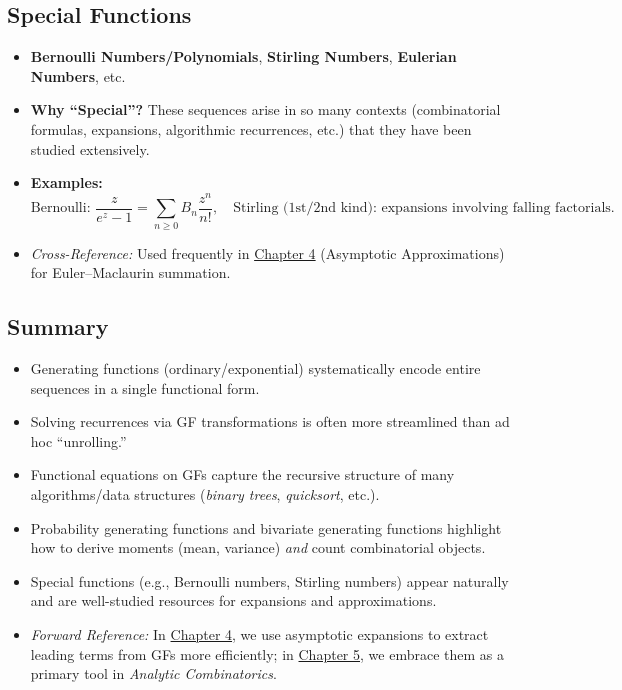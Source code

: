 \documentclass[11pt,letterpaper]{article}
\begin{document}
\subsection{Special Functions}
\begin{itemize}
  \item \textbf{Bernoulli Numbers/Polynomials}, \textbf{Stirling Numbers}, \textbf{Eulerian Numbers}, etc.
  \item \textbf{Why “Special”?} These sequences arise in so many contexts (combinatorial formulas, expansions, algorithmic recurrences, etc.) that they have been studied extensively.
  \item \textbf{Examples:}
    \[
      \text{Bernoulli: } \frac{z}{e^z-1}=\sum_{n\ge0}B_n\frac{z^n}{n!},\quad
      \text{Stirling (1st/2nd kind): expansions involving falling factorials.}
    \]
  \item \emph{Cross-Reference:} Used frequently in \hyperref[sec:asymptotic-ch4]{Chapter 4} (Asymptotic Approximations) for Euler--Maclaurin summation.
\end{itemize}

\subsection{Summary}
\begin{itemize}
  \item Generating functions (ordinary/exponential) systematically encode entire sequences in a single functional form.
  \item Solving recurrences via GF transformations is often more streamlined than ad hoc “unrolling.”
  \item Functional equations on GFs capture the recursive structure of many algorithms/data structures (\emph{binary trees}, \emph{quicksort}, etc.).
  \item Probability generating functions and bivariate generating functions highlight how to derive moments (mean, variance) \emph{and} count combinatorial objects.
  \item Special functions (e.g., Bernoulli numbers, Stirling numbers) appear naturally and are well-studied resources for expansions and approximations.
  \item \emph{Forward Reference:} In \hyperref[sec:asymptotic-ch4]{Chapter 4}, we use asymptotic expansions to extract leading terms from GFs more efficiently; in \hyperref[ch:analytic-comb]{Chapter 5}, we embrace them as a primary tool in \emph{Analytic Combinatorics}.
\end{itemize}
\clearpage
\end{document}
